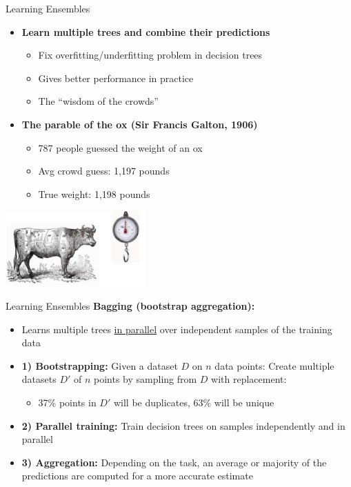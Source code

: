 \begin{frame}[allowframebreaks]{Learning Ensembles}
    \begin{itemize}
        \item \textbf{Learn multiple trees and combine their predictions}
        \begin{itemize}
            \item Fix overfitting/underfitting problem in decision trees
            \item Gives better performance in practice
            \item The “wisdom of the crowds”
        \end{itemize}

        \item \textbf{The parable of the ox (Sir Francis Galton, 1906)}
        \begin{itemize}
            \item 787 people guessed the weight of an ox
            \item Avg crowd guess: 1,197 pounds
            \item True weight: 1,198 pounds
        \end{itemize}
    \end{itemize}

    \begin{center}
        \includegraphics[width=0.4\textwidth]{images/decision-trees/decision-trees-13.png}
    \end{center}
\end{frame}


\begin{frame}[allowframebreaks]{Learning Ensembles}
    \textbf{Bagging (bootstrap aggregation):}
    \begin{itemize}
        \item Learns multiple trees \underline{in parallel} over independent samples of the training data
        \item \textbf{1) Bootstrapping:} Given a dataset $D$ on $n$ data points: Create multiple datasets $D'$ of $n$ points by sampling from $D$ with replacement:
        \begin{itemize}
            \item 37\% points in $D'$ will be duplicates, 63\% will be unique
        \end{itemize}
        \item \textbf{2) Parallel training:} Train decision trees on samples independently and in parallel
        \item \textbf{3) Aggregation:} Depending on the task, an average or majority of the predictions are computed for a more accurate estimate
    \end{itemize}
\end{frame}


